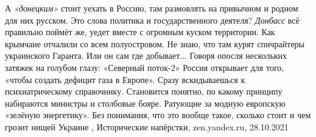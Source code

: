 А \emph{«донецким»} стоит уехать в Россию, там размовлять на привычном и родном
для них русском. Это слова политика и государственного деятеля? \emph{Донбасс}
всё правильно поймёт же, уедет вместе с огромным куском территории. Как
крымчане отчалили со всем полуостровом. Не знаю, что там курят спичрайтеры
украинского Гаранта. Или он сам где добывает...  Говоря опосля нескольких
затяжек на голубом глазу: «Северный поток-2» Россия открывает для того, «чтобы
создать дефицит газа в Европе». Сразу вскидываешься к психиатрическому
справочнику. Становится понятно, по какому принципу набираются министры и
столбовые бояре. Ратующие за модную европскую «зелёную энергетику». Без
понимания, что это вообще такое, сколько стоит и чем грозит нищей Украине
, 
Исторические напёрстки, zen.yandex.ru, 28.10.2021

